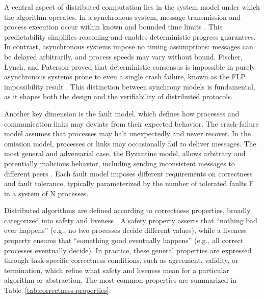 A central aspect of distributed computation lies in the system model under which the algorithm operates. In a synchronous system, message transmission and process execution occur within known and bounded time limits \cite{dolev1982synchronous}. This predictability simplifies reasoning and enables deterministic progress guarantees. In contrast, asynchronous systems impose no timing assumptions: messages can be delayed arbitrarily, and process speeds may vary without bound. Fischer, Lynch, and Paterson proved that deterministic consensus is impossible in purely asynchronous systems prone to even a single crash failure, known as the FLP impossibility result \cite{fischer1985flp}. This distinction between synchrony models is fundamental, as it shapes both the design and the verifiability of distributed protocols.

Another key dimension is the fault model, which defines how processes and communication links may deviate from their expected behavior. The crash-failure model assumes that processes may halt unexpectedly and never recover. In the omission model, processes or links may occasionally fail to deliver messages. The most general and adversarial case, the Byzantine model, allows arbitrary and potentially malicious behavior, including sending inconsistent messages to different peers \cite{lamport1982byzantine}. Each fault model imposes different requirements on correctness and fault tolerance, typically parameterized by the number of tolerated faults F in a system of N processes.

Distributed algorithms are defined according to correctness properties, broadly categorized into safety and liveness \cite{alpern1985safety}. A safety property asserts that “nothing bad ever happens” (e.g., no two processes decide different values), while a liveness property ensures that “something good eventually happens” (e.g., all correct processes eventually decide). In practice, these general properties are expressed through task-specific correctness conditions, such as agreement, validity, or termination, which refine what safety and liveness mean for a particular algorithm or abstraction. The most common properties are summarized in Table~\ref{tab:correctness-properties}.

